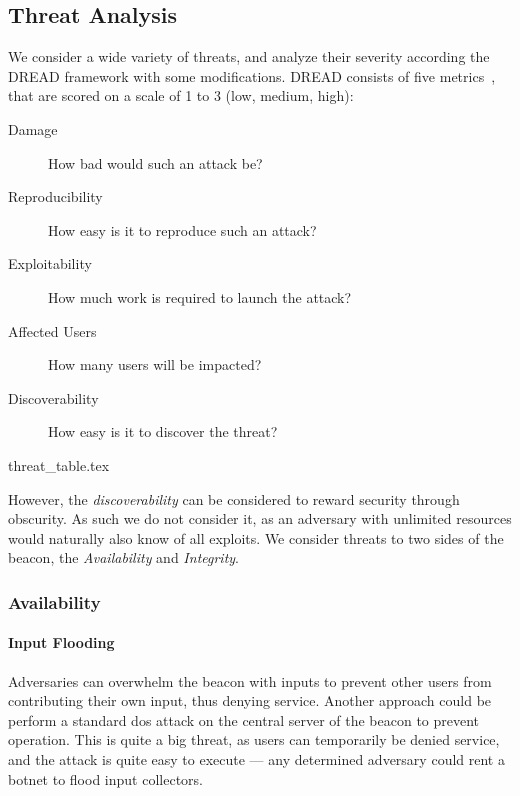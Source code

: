 \subsection{Threat Analysis}
We consider a wide variety of threats, and analyze their severity according the DREAD framework with some modifications. DREAD consists of five metrics~\cite{dread}, that are scored on a scale of 1 to 3 (low, medium, high):
\begin{description}
    \item [Damage] How bad would such an attack be?
    \item [Reproducibility] How easy is it to reproduce such an attack?
    \item [Exploitability] How much work is required to launch the attack?
    \item [Affected Users] How many users will be impacted?
    \item [Discoverability] How easy is it to discover the threat?
\end{description}

{threat_table.tex}

However, the \emph{discoverability} can be considered to reward security through obscurity. As such we do not consider it, as an adversary with unlimited resources would naturally also know of all exploits.
We consider threats to two sides of the beacon, the \emph{Availability} and \emph{Integrity}.

\subsubsection{Availability}

\paragraph{Input Flooding} Adversaries can overwhelm the beacon with inputs to prevent other users from contributing their own input, thus denying service. Another approach could be perform a standard \gls{dos} attack on the central server of the beacon to prevent operation. This is quite a big threat, as users can temporarily be denied service, and the attack is quite easy to execute --- any determined adversary could rent a botnet to flood input collectors.    %
